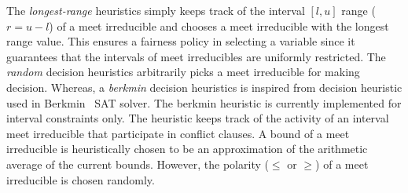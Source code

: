 The {\em longest-range} heuristics simply keeps track of the
interval $[l,u]$ range ($r=u-l$) of a meet irreducible and chooses 
a meet irreducible with the longest range value.  This ensures a 
fairness policy in selecting a variable since it guarantees that 
the intervals of meet irreducibles are uniformly restricted.  
%
The {\em random} decision heuristics arbitrarily picks a meet irreducible  
for making decision. 
%
%
Whereas, a {\em berkmin} decision heuristics is inspired 
from decision heuristic used in Berkmin~\cite{eugoldberg07} SAT solver.  
The berkmin heuristic is currently implemented for interval constraints only.  
The heuristic keeps track of the activity of an interval meet irreducible 
that participate in conflict clauses. 
%
A bound of a meet irreducible is heuristically chosen to be an approximation of the 
arithmetic average of the current bounds.  However, the polarity ($\leq$ or $\geq$) 
of a meet irreducible is chosen randomly.  
